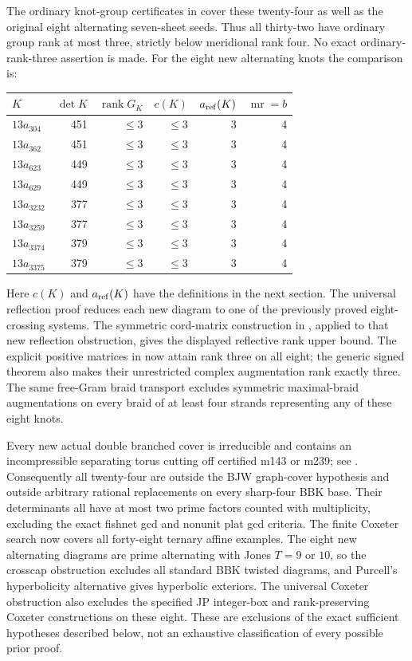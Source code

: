 \documentclass[11pt]{article}
\newcommand{\mr}{\operatorname{mr}}
\begin{document}
The ordinary knot-group certificates in
 cover these twenty-four as well
as the original eight alternating seven-sheet seeds. Thus all
thirty-two have ordinary group rank at most three, strictly below
meridional rank four. No exact ordinary-rank-three assertion is made.
For the eight new alternating knots the comparison is:
\begin{center}
\begin{tabular}{lrrrrr}
\hline
$K$ & $\det K$ & $\operatorname{rank}G_K$ & $c(K)$ & $a_{\rm ref}(K)$ & $\mr=b$\\
\hline
$13a_{304}$  &451&$\le3$&$\le3$&3&4\\
$13a_{362}$  &451&$\le3$&$\le3$&3&4\\
$13a_{623}$  &449&$\le3$&$\le3$&3&4\\
$13a_{629}$  &449&$\le3$&$\le3$&3&4\\
$13a_{3232}$ &377&$\le3$&$\le3$&3&4\\
$13a_{3259}$ &377&$\le3$&$\le3$&3&4\\
$13a_{3374}$ &379&$\le3$&$\le3$&3&4\\
$13a_{3375}$ &379&$\le3$&$\le3$&3&4\\
\hline
\end{tabular}
\end{center}
Here $c(K)$ and $a_{\rm ref}(K)$ have the definitions in the next
section. The universal reflection proof reduces each new diagram to
one of the previously proved eight-crossing systems. The symmetric
cord-matrix construction in
, applied to that new
reflection obstruction, gives the displayed reflective rank upper
bound. The explicit positive matrices in
 now attain rank three on all
eight; the generic signed theorem also makes their unrestricted
complex augmentation rank exactly three.
The same free-Gram braid transport excludes symmetric maximal-braid
augmentations on every braid of at least four strands representing
any of these eight knots.

Every new actual double branched cover is irreducible and contains
an incompressible separating torus cutting off certified m143 or m239;
see . Consequently all twenty-four are
outside the BJW graph-cover hypothesis and outside arbitrary rational
replacements on every sharp-four BBK base. Their determinants all
have at most two prime factors counted with multiplicity, excluding
the exact fishnet gcd and nonunit plat gcd criteria. The finite Coxeter
search now covers all forty-eight ternary affine examples. The eight new
alternating diagrams are prime alternating with Jones $T=9$ or $10$,
so the crosscap obstruction excludes all standard BBK twisted diagrams,
and Purcell's hyperbolicity alternative gives hyperbolic exteriors.
The universal Coxeter obstruction also excludes the specified JP
integer-box and rank-preserving Coxeter constructions on these eight.
These are exclusions of the exact sufficient hypotheses described
below, not an exhaustive classification of every possible prior proof.
\end{document}
